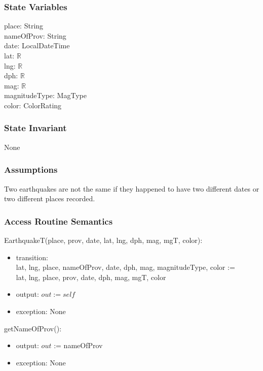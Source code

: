 \documentclass[12pt]{article}
\begin{document}
\subsubsection* {State Variables}

place: String\\ 
nameOfProv: String\\
date: LocalDateTime\\
lat: $\mathbb{R}$\\
lng: $\mathbb{R}$\\
dph: $\mathbb{R}$\\
mag: $\mathbb{R}$\\
magnitudeType: MagType\\
color: ColorRating

\subsubsection* {State Invariant}

None

\subsubsection* {Assumptions}

Two earthquakes are not the same if they happened to have two different dates or two different places recorded.

\medskip

\subsubsection* {Access Routine Semantics}

EarthquakeT(place, prov, date, lat, lng, dph, mag, mgT, color):
\begin{itemize}
\item transition: \\ lat, lng, place, nameOfProv, date, dph, mag, magnitudeType, color :=\\
  lat, lng, place, prov, date, dph, mag, mgT, color
\item output: $\mathit{out} := \mathit{self}$
\item exception: None
\end{itemize}

\noindent getNameOfProv():
\begin{itemize}
\item output: $out$ := nameOfProv
\item exception: None
\end{itemize}
\end{document}
